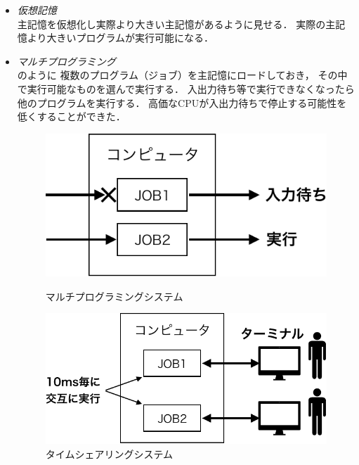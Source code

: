 \begin{itemize}
\item \emph{仮想記憶} \\
  主記憶を仮想化し実際より大きい主記憶があるように見せる．
  実際の主記憶より大きいプログラムが実行可能になる．
\item \emph{マルチプログラミング} \\
  \label{multiprogramming}
  のように
  複数のプログラム（ジョブ）を主記憶にロードしておき，
  その中で実行可能なものを選んで実行する．
  入出力待ち等で実行できなくなったら他のプログラムを実行する．
  高価なCPUが入出力待ちで停止する可能性を低くすることができた．
  \begin{figure}[btp]
    \begin{center}
      \begin{minipage}{0.49\columnwidth}
        \centerline{
          \includegraphics[scale=0.66]{Fig/multiprogramming-crop.pdf}}
        \caption{マルチプログラミングシステム}\label{fig:multiprogramming}
      \end{minipage}
      \begin{minipage}{0.49\columnwidth}
        \centerline{
          \includegraphics[scale=0.66]{Fig/timesharing-crop.pdf}}
        \caption{タイムシェアリングシステム}\label{fig:timesharing}

\end{minipage}
\end{center}
\end{figure}
\end{itemize}
